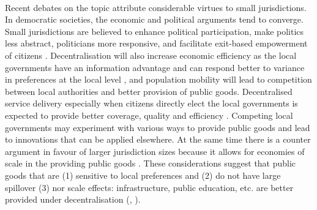 \documentclass[12pt, a4paper]{article}
\begin{document}
\paragraph{} Recent debates on the topic attribute considerable virtues to small jurisdictions. In democratic societies, the economic and political arguments tend to converge. Small jurisdictions are believed to enhance political participation, make politics less abstract, politicians more responsive, and facilitate exit-based empowerment of citizens \parencite{hansen_size_2014}. Decentralisation will also increase economic efficiency as the local governments have an information advantage and can respond better to variance in preferences at the local level \parencite{oates_fiscal_1972}, and population mobility will lead to competition between local authorities and better provision of public goods. Decentralised service delivery especially when citizens directly elect the local governments is expected to provide better coverage, quality and efficiency \parencite{smoke2015rethinking}. Competing local governments may experiment with various ways to provide public goods and lead to innovations that can be applied elsewhere. At the same time there is a counter argument in favour of larger jurisdiction sizes because it allows for economies of scale in the providing public goods \parencite{hirsch_expenditure_1959}. These considerations suggest that public goods that are (1) sensitive to local preferences and (2) do not have large spillover (3) nor scale effects: infrastructure, public education, etc. are better provided under decentralisation (\cite{tiebout_economies_1960}, \cite{oates_fiscal_1972}). 
	
\end{document}
